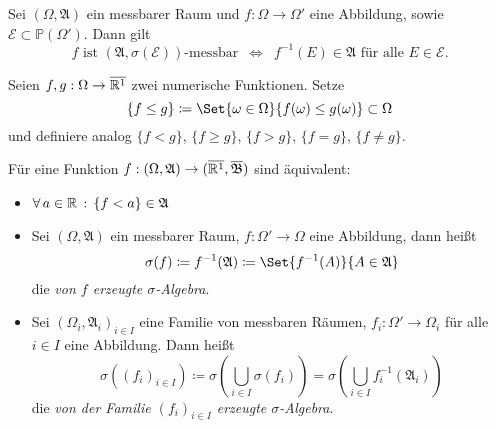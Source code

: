 \documentclass{cheat-sheet}
\newcommand{\Alg}{\mathfrak{A}} %
\renewcommand{\P}{\mathbb{P}} %
\newcommand{\Bor}{\mathfrak{B}} %
\renewcommand{\ER}{\overline{\R^1}} %
\begin{document}
\begin{lem}
  Sei $(\Omega, \Alg)$ ein messbarer Raum und $f : \Omega \to \Omega'$ eine Abbildung, sowie $\mathcal{E} \subset \P(\Omega')$. Dann gilt
  \[ f \text{ ist $(\Alg, \sigma(\mathcal{E}))$-messbar} \enspace \iff \enspace f^{-1}(E) \in \Alg \text{ für alle } E \in \mathcal{E}. \]
\end{lem}

\begin{nota}
  Seien $f, g : \Omega \to \ER$ zwei numerische Funktionen. Setze
    \[ \{ f \leq g \} \coloneqq \Set{ \omega \in \Omega }{ f(\omega) \leq g(\omega) } \subset \Omega \]
  und definiere analog $\{ f < g \}$, $\{ f \geq g \}$, $\{ f > g \}$, $\{ f = g \}$, $\{ f \not= g \}$.
\end{nota}

\begin{satz}
  Für eine Funktion $f : (\Omega, \Alg) \to (\ER, \overline{\Bor})$ sind äquivalent:
  \begin{itemize}
    \miniitem{0.7 \linewidth}{$\forall \, a \in \R \,:\, \{ f \geq a \} = f^{-1}(\cinterval{a}{\infty}) \in \Alg$}
    \item $\fa{a \in \R} \{ f < a \} \in \Alg$
  \end{itemize}
\end{satz}

\begin{defn}
  \begin{itemize}
    \item Sei $(\Omega, \Alg)$ ein messbarer Raum, $f : \Omega' \to \Omega$ eine Abbildung, dann heißt
    \[ \sigma(f) \coloneqq f^{-1}(\Alg) \coloneqq \Set{ f^{-1}(A) }{ A \in \Alg } \]
    die \emph{von $f$ erzeugte $\sigma$-Algebra}.
    \item Sei $(\Omega_i, \Alg_i)_{i \in I}$ eine Familie von messbaren Räumen, $f_i : \Omega' \to \Omega_i$ für alle $i \in I$ eine Abbildung. Dann heißt
    \[ \sigma((f_i)_{i \in I}) \coloneqq \sigma(\bigcup_{i \in I} \sigma(f_i)) = \sigma(\bigcup_{i \in I} f_i^{-1}(\Alg_i)) \]
    die \emph{von der Familie $(f_i)_{i \in I}$ erzeugte $\sigma$-Algebra}.
  \end{itemize}
\end{defn}
\end{document}
